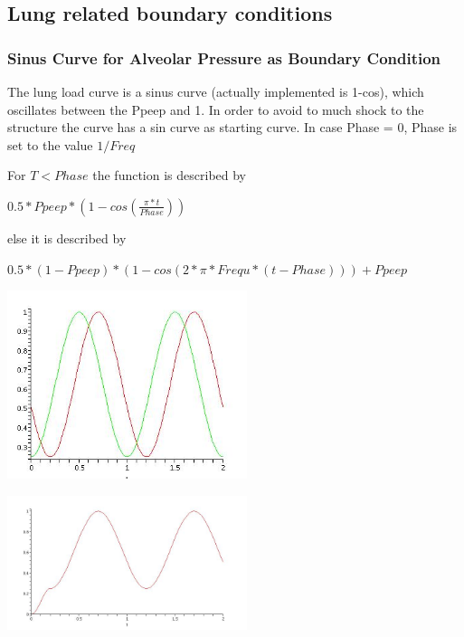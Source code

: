 \subsection{Lung related boundary conditions}

\subsubsection*{Sinus Curve for Alveolar Pressure as Boundary Condition}

The lung load curve is a sinus curve (actually implemented is 1-cos),
which oscillates between the Ppeep and 1. In order to avoid to much
shock to the structure the curve has a sin curve as starting curve.
In case Phase = 0, Phase is set to the value $1/Freq$ \bigskip
\par For $T<Phase$ the function is described by 
\begin{center}
$0.5*Ppeep*(1 - cos(\frac{\pi*t}{Phase}))$
\end{center}
\par else it is described by 
\begin{center}
$0.5*(1-Ppeep)*(1 - cos(2*\pi*Frequ*(t - Phase))) + Ppeep$
\end{center}

\begin{center}
\includegraphics[width=70mm]{phase}
\end{center}

\begin{center}
\includegraphics[width=70mm]{start}
\end{center}


